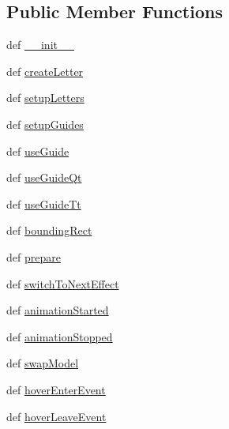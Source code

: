\subsection*{Public Member Functions}
\begin{DoxyCompactItemize}
\item 
def \hyperlink{classitemcircleanimation_1_1ItemCircleAnimation_a9c09d6f4bcc837db1449294de68dbb5b}{\+\_\+\+\_\+init\+\_\+\+\_\+}
\item 
def \hyperlink{classitemcircleanimation_1_1ItemCircleAnimation_a727f7e6e701bef7771c82b27095ddd17}{create\+Letter}
\item 
def \hyperlink{classitemcircleanimation_1_1ItemCircleAnimation_a751233bb24b7b970cb90934ff331e1ef}{setup\+Letters}
\item 
def \hyperlink{classitemcircleanimation_1_1ItemCircleAnimation_a0063d30752a45c5e6ccb62a3e187248f}{setup\+Guides}
\item 
def \hyperlink{classitemcircleanimation_1_1ItemCircleAnimation_a670788b3858091a604f6973c58e930bb}{use\+Guide}
\item 
def \hyperlink{classitemcircleanimation_1_1ItemCircleAnimation_a99ac6857040c2e3ed388128939a45957}{use\+Guide\+Qt}
\item 
def \hyperlink{classitemcircleanimation_1_1ItemCircleAnimation_aeb64fe87a97729386f6d33b109bc73cc}{use\+Guide\+Tt}
\item 
def \hyperlink{classitemcircleanimation_1_1ItemCircleAnimation_a329208bd3ca9242f0a1976aa3f4a86e1}{bounding\+Rect}
\item 
def \hyperlink{classitemcircleanimation_1_1ItemCircleAnimation_a1b486abded4c7d65c91b04c8a8dcfe39}{prepare}
\item 
def \hyperlink{classitemcircleanimation_1_1ItemCircleAnimation_a6743b6f75e1613ba1f92388bd4d66d1b}{switch\+To\+Next\+Effect}
\item 
def \hyperlink{classitemcircleanimation_1_1ItemCircleAnimation_a80a28b513ab28453c851c8818b5cd968}{animation\+Started}
\item 
def \hyperlink{classitemcircleanimation_1_1ItemCircleAnimation_a96a9489553a5ac0fdc365868d970c4dd}{animation\+Stopped}
\item 
def \hyperlink{classitemcircleanimation_1_1ItemCircleAnimation_a8d7eb6e85cd977daa5b1b0d843dd8479}{swap\+Model}
\item 
def \hyperlink{classitemcircleanimation_1_1ItemCircleAnimation_a59bb5baa3e718c7edba234425bebeede}{hover\+Enter\+Event}
\item 
def \hyperlink{classitemcircleanimation_1_1ItemCircleAnimation_aebfa27d5a6f532c5d22700182297e2f4}{hover\+Leave\+Event}

\end{DoxyCompactItemize}
